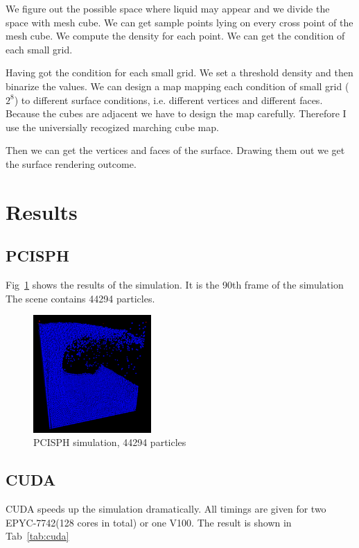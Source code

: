 \documentclass[acmtog]{acmart}
\begin{document}
We figure out the possible space where liquid may appear and we divide the space with mesh cube. We can get sample points lying on
every cross point of the mesh cube. We compute the density for each point. We can get the condition of each small grid.

Having got the condition for each small grid. We set a threshold density and then binarize the values. We can design a map mapping each condition of small grid ($2^8$) to
different surface conditions, i.e. different vertices and different faces. Because the cubes are adjacent we have to design the map carefully.
Therefore I use the universially recogized marching cube map.

Then we can get the vertices and faces of the surface. Drawing them out we get the surface rendering outcome.

\section{Results}

\subsection{PCISPH}

Fig~\ref{fig:particle} shows the results of the simulation.
It is the 90th frame of the simulation
The scene contains 44294 particles.

\begin{figure}[h]
	\centering
	\includegraphics[width=0.40\textwidth]{particle.png}
	\caption{PCISPH simulation, 44294 particles}
	\label{fig:particle}
\end{figure}

\subsection{CUDA}

CUDA speeds up the simulation dramatically.
All timings are given for two EPYC-7742(128 cores in total) or one V100.
The result is shown in Tab~\ref{tab:cuda}
\end{document}
